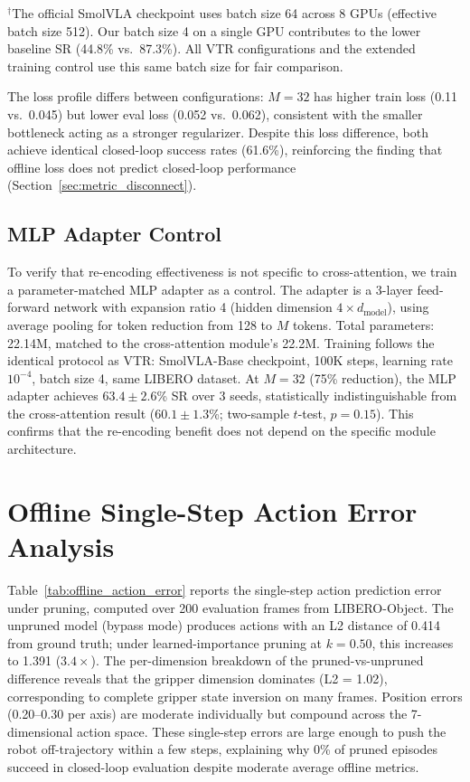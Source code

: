 \begin{table}[ht]
\vspace{2pt}
{\footnotesize $^\dagger$The official SmolVLA checkpoint uses batch size 64 across 8 GPUs (effective batch size 512). Our batch size 4 on a single GPU contributes to the lower baseline SR (44.8\% vs.\ 87.3\%). All VTR configurations and the extended training control use this same batch size for fair comparison.}
\end{table}

The loss profile differs between configurations: $M=32$ has higher train loss (0.11 vs.\ 0.045) but lower eval loss (0.052 vs.\ 0.062), consistent with the smaller bottleneck acting as a stronger regularizer. Despite this loss difference, both achieve identical closed-loop success rates (61.6\%), reinforcing the finding that offline loss does not predict closed-loop performance (Section~\ref{sec:metric_disconnect}).

\subsection{MLP Adapter Control}
\label{app:mlp_adapter}

To verify that re-encoding effectiveness is not specific to cross-attention, we train a parameter-matched MLP adapter as a control. The adapter is a 3-layer feed-forward network with expansion ratio 4 (hidden dimension $4 \times d_{\text{model}}$), using average pooling for token reduction from 128 to $M$ tokens. Total parameters: 22.14M, matched to the cross-attention module's 22.2M. Training follows the identical protocol as VTR: SmolVLA-Base checkpoint, 100K steps, learning rate $10^{-4}$, batch size 4, same LIBERO dataset. At $M = 32$ (75\% reduction), the MLP adapter achieves $63.4 \pm 2.6$\% SR over 3 seeds, statistically indistinguishable from the cross-attention result ($60.1 \pm 1.3$\%; two-sample $t$-test, $p = 0.15$). This confirms that the re-encoding benefit does not depend on the specific module architecture.


\section{Offline Single-Step Action Error Analysis}
\label{app:offline_error}

Table~\ref{tab:offline_action_error} reports the single-step action prediction error under pruning, computed over 200 evaluation frames from LIBERO-Object. The unpruned model (bypass mode) produces actions with an L2 distance of 0.414 from ground truth; under learned-importance pruning at $k{=}0.50$, this increases to 1.391 ($3.4\times$). The per-dimension breakdown of the pruned-vs-unpruned difference reveals that the gripper dimension dominates (L2 = 1.02), corresponding to complete gripper state inversion on many frames. Position errors (0.20--0.30 per axis) are moderate individually but compound across the 7-dimensional action space. These single-step errors are large enough to push the robot off-trajectory within a few steps, explaining why 0\% of pruned episodes succeed in closed-loop evaluation despite moderate average offline metrics.

